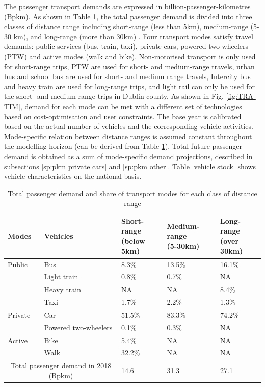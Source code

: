 \documentclass[gmd,manuscript]{copernicus}
\begin{document}
The passenger transport demands are expressed in billion-passenger-kilometres (Bpkm). As shown in Table \ref{passenger transport demand}, the total passenger demand is divided into three classes of distance range including short-range (less than 5km), medium-range (5-30 km), and long-range (more than 30km) \citep{NTA2018}. Four transport modes satisfy travel demands: public services (bus, train, taxi), private cars, powered two-wheelers (PTW) and active modes (walk and bike). Non-motorised transport is only used for short-range trips, PTW are used for short- and medium-range travels, urban bus and school bus are used for short- and medium range travels, Intercity bus and heavy train are used for long-range trips, and light rail can only be used for the short- and medium-range trips in Dublin county. As shown in Fig. \ref{fig:TRA-TIM}, demand for each mode can be met with a different set of technologies based on cost-optimisation and user constraints. The base year is calibrated based on the actual number of vehicles and the corresponding vehicle activities. Mode-specific relation between distance ranges is assumed constant throughout the modelling horizon (can be derived from Table \ref{passenger transport demand}). Total future passenger demand is obtained as a sum of mode-specific demand projections, described in subsections \ref{sp:pkm private cars} and \ref{sp:pkm other}. Table \ref{vehicle stock} shows vehicle characteristics on the national basis. 

\begin{table}[h!]
 \centering
 \footnotesize
 \caption{Total passenger demand and share of transport modes for each class of distance range \citep{CentralStatisticsOffice2017, CSONTS19how, CentralStatisticsOffice2020a, CentralStatisticsOffice2020c, CentralStatisticsOffice2020d, CentralStatisticsOffice2020e}}
 \begin{tabular}{lllll}
 \hline 
 Modes & Vehicles & \makecell{Short-range \\ (below 5km)} & \makecell{Medium-range \\ (5-30km)} & \makecell{Long-range \\ (over 30km)} \\ 
 \hline
 Public & Bus & 8.3\% &	13.5\% &	16.1\% \\
 & Light train &	0.8\% &	0.7\% &	NA \\
 & Heavy train &	NA & NA &	8.4\% \\
 & Taxi &	1.7\% &	2.2\% &	1.3\% \\
 \hline
 Private & Car	& 51.5\% &	83.3\%	& 74.2\% \\
 & Powered two-wheelers & 0.1\% &	0.3\%	& NA \\
 \hline
 Active & Bike &	5.4\% & 	NA & 	NA \\
 
 & Walk &	32.2\% &	NA &	NA \\
 \hline
 \multicolumn{2}{c}{Total passenger demand in 2018 (Bpkm)} &	14.6 &	31.3 &	27.1 \\ [1ex]
 \hline
 \end{tabular}
 
 \label{passenger transport demand}
\end{table}
\end{document}
